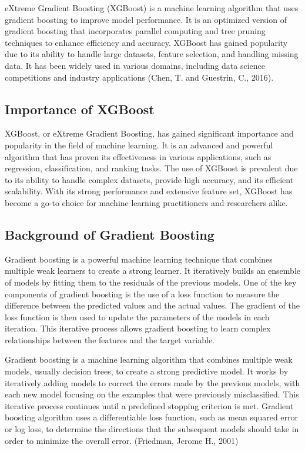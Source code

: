 \documentclass[12pt,oneside]{report}
\begin{document}
eXtreme Gradient Boosting (XGBoost) is a machine learning algorithm that uses gradient boosting to improve model performance. It is an optimized version of gradient boosting that incorporates parallel computing and tree pruning techniques to enhance efficiency and accuracy. XGBoost has gained popularity due to its ability to handle large datasets, feature selection, and handling missing data. It has been widely used in various domains, including data science competitions and industry applications (Chen, T. and Guestrin, C., 2016).

\subsection{Importance of XGBoost}
XGBoost, or eXtreme Gradient Boosting, has gained significant importance and popularity in the field of machine learning. It is an advanced and powerful algorithm that has proven its effectiveness in various applications, such as regression, classification, and ranking tasks. The use of XGBoost is prevalent due to its ability to handle complex datasets, provide high accuracy, and its efficient scalability. With its strong performance and extensive feature set, XGBoost has become a go-to choice for machine learning practitioners and researchers alike. 

\subsection{Background of Gradient Boosting}
Gradient boosting is a powerful machine learning technique that combines multiple weak learners to create a strong learner. It iteratively builds an ensemble of models by fitting them to the residuals of the previous models. One of the key components of gradient boosting is the use of a loss function to measure the difference between the predicted values and the actual values. The gradient of the loss function is then used to update the parameters of the models in each iteration. This iterative process allows gradient boosting to learn complex relationships between the features and the target variable. 

Gradient boosting is a machine learning algorithm that combines multiple weak models, usually decision trees, to create a strong predictive model. It works by iteratively adding models to correct the errors made by the previous models, with each new model focusing on the examples that were previously misclassified. This iterative process continues until a predefined stopping criterion is met. Gradient boosting algorithm uses a differentiable loss function, such as mean squared error or log loss, to determine the directions that the subsequent models should take in order to minimize the overall error. (Friedman, Jerome H., 2001)
\end{document}

